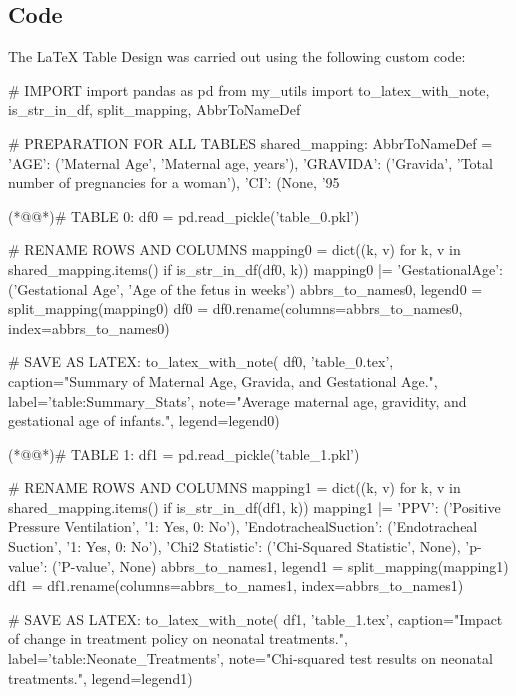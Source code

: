 \documentclass[11pt]{article}
\begin{document}
\subsection{{Code}}
The LaTeX Table Design was carried out using the following custom code:

\begin{python}

# IMPORT
import pandas as pd
from my_utils import to_latex_with_note, is_str_in_df, split_mapping, AbbrToNameDef 

# PREPARATION FOR ALL TABLES
shared_mapping: AbbrToNameDef = {
    'AGE': ('Maternal Age', 'Maternal age, years'),
    'GRAVIDA': ('Gravida', 'Total number of pregnancies for a woman'),
    'CI': (None, '95%
}

(*@@*)# TABLE 0:
df0 = pd.read_pickle('table_0.pkl')

# RENAME ROWS AND COLUMNS
mapping0 = dict((k, v) for k, v in shared_mapping.items() if is_str_in_df(df0, k)) 
mapping0 |= {
    'GestationalAge': ('Gestational Age', 'Age of the fetus in weeks')
}
abbrs_to_names0, legend0 = split_mapping(mapping0)
df0 = df0.rename(columns=abbrs_to_names0, index=abbrs_to_names0)

# SAVE AS LATEX:
to_latex_with_note(
    df0, 'table_0.tex',
    caption="Summary of Maternal Age, Gravida, and Gestational Age.", 
    label='table:Summary_Stats',
    note="Average maternal age, gravidity, and gestational age of infants.",
    legend=legend0)


(*@@*)# TABLE 1:
df1 = pd.read_pickle('table_1.pkl')

# RENAME ROWS AND COLUMNS
mapping1 = dict((k, v) for k, v in shared_mapping.items() if is_str_in_df(df1, k)) 
mapping1 |= {
    'PPV': ('Positive Pressure Ventilation', '1: Yes, 0: No'),
    'EndotrachealSuction': ('Endotracheal Suction', '1: Yes, 0: No'),
    'Chi2 Statistic': ('Chi-Squared Statistic', None),
    'p-value': ('P-value', None)
}
abbrs_to_names1, legend1 = split_mapping(mapping1)
df1 = df1.rename(columns=abbrs_to_names1, index=abbrs_to_names1)

# SAVE AS LATEX:
to_latex_with_note(
    df1, 'table_1.tex', 
    caption="Impact of change in treatment policy on neonatal treatments.",
    label='table:Neonate_Treatments', 
    note="Chi-squared test results on neonatal treatments.", 
    legend=legend1)



\end{python}
\end{document}
